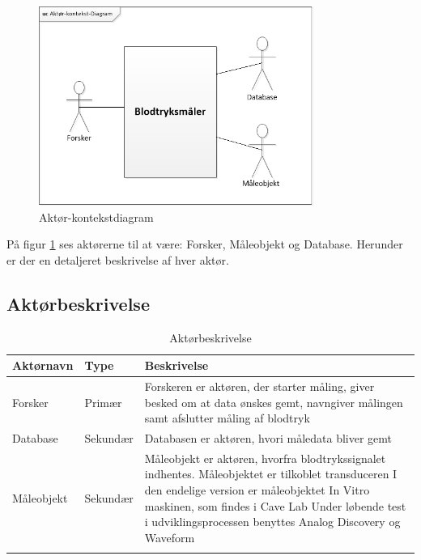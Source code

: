 \begin{figure}[H]
	\centering
	\includegraphics[width=0.8\textwidth]{Figurer/Aktor-kontekst-diagram}
	\caption{Aktør-kontekstdiagram}
	\label{fig:aktoerbeskrivelse}
\end{figure}
På figur \ref{fig:aktoerbeskrivelse} ses aktørerne til at være: Forsker, Måleobjekt og Database. Herunder er der en detaljeret beskrivelse af hver aktør.


\subsection{Aktørbeskrivelse}

\begin{table}[H]
\begin{tabularx}{\textwidth}{l l X}
     Aktørnavn	&	Type		&	Beskrivelse \\ \midrule
     Forsker   	& 	Primær  	& 	Forskeren er aktøren, der starter måling, giver besked om at data ønskes gemt, navngiver målingen samt afslutter måling af blodtryk \\ 			  \addlinespace[2mm]
     Database	&	Sekundær	&	Databasen er aktøren, hvori måledata bliver gemt \\   \addlinespace[2mm]
     Måleobjekt	&	Sekundær	&	Måleobjekt er aktøren, hvorfra blodtrykssignalet indhentes. Måleobjektet er tilkoblet transduceren
     I den endelige version er måleobjektet In Vitro maskinen, som findes i Cave Lab
     Under løbende test i udviklingsprocessen benyttes Analog Discovery og Waveform \\   \addlinespace[2mm]
     
   
     \bottomrule                                                                                                                   
    \end{tabularx}
    \caption {Aktørbeskrivelse}
    \label{tab:aktoerbeskrivelse}
	
\end{table}

